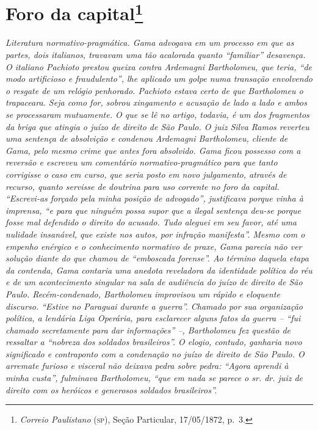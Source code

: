 \chapter{Foro da capital\footnote{\emph{Correio Paulistano} (\textsc{sp}), Seção Particular,
  17/05/1872, p.~3.}} %

\begin{didascalia}
\emph{Literatura normativo-pragmática. Gama advogava em um processo em
que as partes, dois italianos, travavam uma tão acalorada quanto
``familiar'' desavença. O italiano Pachioto prestou queixa contra
Ardemagni Bartholomeu, que teria, ``de modo artificioso e fraudulento'',
lhe aplicado um golpe numa transação envolvendo o resgate de um relógio
penhorado. Pachioto estava certo de que Bartholomeu o trapaceara. Seja
como for, sobrou xingamento e acusação de lado a lado e ambos se
processaram mutuamente. O que se lê no artigo, todavia, é um dos
fragmentos da briga que atingia o juízo de direito de São Paulo. O juiz
Silva Ramos reverteu uma sentença de absolvição e condenou Ardemagni
Bartholomeu, cliente de Gama, pelo mesmo crime que antes fora absolvido.
Gama ficou possesso com a reversão e escreveu um comentário
normativo-pragmático para que tanto corrigisse o caso em curso, que
seria posto em novo julgamento, através de recurso, quanto servisse de
doutrina para uso corrente no foro da capital. ``Escrevi-as forçado pela
minha posição de advogado'', justificava porque vinha à imprensa, ``e para
que ninguém possa supor que a ilegal sentença deu-se porque fosse mal
defendido o direito do acusado. Tudo aleguei em seu favor, até uma
nulidade insanável, que existe nos autos, por infração manifesta''. Mesmo
com o empenho enérgico e o conhecimento normativo de praxe, Gama parecia
não ver solução diante do que chamou de ``emboscada forense''. Ao término
daquela etapa da contenda, Gama contaria uma anedota reveladora da
identidade política do réu e de um acontecimento singular na sala de
audiência do juízo de direito de São Paulo. Recém-condenado, Bartholomeu
improvisou um rápido e eloquente discurso. ``Estive no Paraguai durante a
guerra''. Chamado por sua organização política, a lendária Liga Operária,
para esclarecer alguns fatos da guerra -- ``fui chamado secretamente para
dar informações'' --, Bartholomeu fez questão de ressaltar a ``nobreza dos
soldados brasileiros''. O elogio, contudo, ganharia novo significado e
contraponto com a condenação no juízo de direito de São Paulo. O
arremate furioso e visceral não deixava pedra sobre pedra: ``Agora
aprendi à minha custa'', fulminava Bartholomeu, ``que em nada se parece o
sr. dr. juiz de direito com os heróicos e generosos soldados
brasileiros''.}
\end{didascalia}

